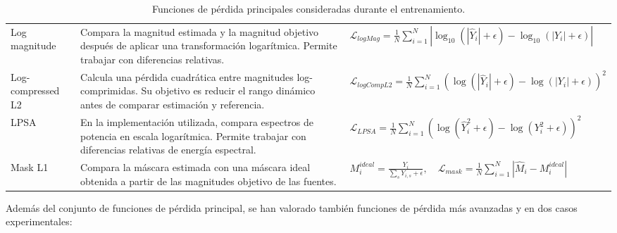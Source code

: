 \begin{table}[H]
\begin{adjustbox}{
        max width=\textwidth,
        max totalheight=0.80\textheight,
        keepaspectratio
        }
\begin{tabular}{p{} p{} p{}}
            Log magnitude &
            Compara la magnitud estimada y la magnitud objetivo después de aplicar una transformación logarítmica. Permite trabajar con diferencias relativas. &
            \( \mathcal{L}_{logMag} = \frac{1}{N}\sum_{i=1}^{N}\left|\log_{10}(|\hat{Y}_i|+\epsilon)-\log_{10}(|Y_i|+\epsilon)\right| \)
            \\

            Log-compressed L2 &
            Calcula una pérdida cuadrática entre magnitudes log-comprimidas. Su objetivo es reducir el rango dinámico antes de comparar estimación y referencia. &
            \( \mathcal{L}_{logCompL2} = \frac{1}{N}\sum_{i=1}^{N}\left(\log(|\hat{Y}_i|+\epsilon)-\log(|Y_i|+\epsilon)\right)^2 \)
            \\

            LPSA &
            En la implementación utilizada, compara espectros de potencia en escala logarítmica. Permite trabajar con diferencias relativas de energía espectral. &
            \( \mathcal{L}_{LPSA} = \frac{1}{N}\sum_{i=1}^{N}\left(\log(\hat{Y}_i^2+\epsilon)-\log(Y_i^2+\epsilon)\right)^2 \)
            \\

            Mask L1 &
            Compara la máscara estimada con una máscara ideal obtenida a partir de las magnitudes objetivo de las fuentes. &
            \( M_i^{ideal} = \frac{Y_i}{\sum_s Y_{i,s}+\epsilon}, \quad \mathcal{L}_{mask} = \frac{1}{N}\sum_{i=1}^{N}|\hat{M}_i - M_i^{ideal}| \)
            \\

            \bottomrule
        \end{tabular}
    \end{adjustbox}
    \caption{Funciones de pérdida principales consideradas durante el entrenamiento.}
    \label{tab:perdidas-principales}
\end{table}

Además del conjunto de funciones de pérdida principal, se han valorado también funciones de pérdida más avanzadas y en dos casos experimentales:


